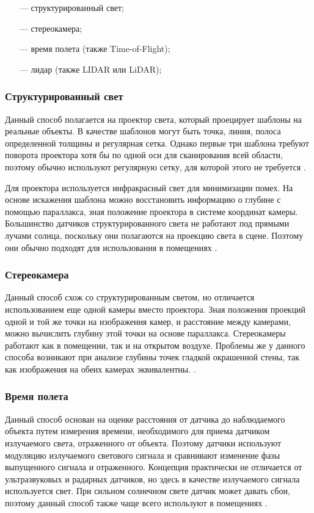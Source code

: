 \begin{itemize}
	\item[---] структурированный свет;
	\item[---] стереокамера;
	\item[---] время полета (также Time-of-Flight);
	\item[---] лидар (также LIDAR или LiDAR);
\end{itemize}

\subsubsection*{Структурированный свет}

Данный способ полагается на проектор света, который проецирует шаблоны на реальные объекты. В качестве шаблонов могут быть точка, линия, полоса определенной толщины и регулярная сетка. Однако первые три шаблона требуют поворота проектора хотя бы по одной оси для сканирования всей области, поэтому обычно используют регулярную сетку, для которой этого не требуется \cite{struct_light}. 

Для проектора используется инфракрасный свет для минимизации помех. На основе искажения шаблона можно восстановить информацию о глубине с помощью параллакса, зная положение проектора в системе координат камеры. Большинство датчиков структурированного света не работают под прямыми лучами солнца, поскольку они полагаются на проекцию света в сцене. Поэтому они обычно подходят для использования в помещениях \cite{struct_light}.

\subsubsection*{Стереокамера}

Данный способ схож со структурированным светом, но отличается использованием еще одной камеры вместо проектора. Зная положения проекций одной и той же точки на изображения камер, и расстояние между камерами, можно вычислить глубину этой точки на основе параллакса. Стереокамеры работают как в помещении, так и на открытом воздухе. Проблемы же у данного способа возникают при анализе глубины точек гладкой окрашенной стены, так как изображения на обеих камерах эквивалентны. \cite{rgbd}.

\subsubsection*{Время полета}

Данный способ основан на оценке расстояния от датчика до наблюдаемого объекта путем измерения времени, необходимого для приема датчиком излучаемого света, отраженного от объекта. Поэтому датчики используют модуляцию излучаемого светового сигнала и сравнивают изменение фазы выпущенного сигнала и отраженного. Концепция практически не отличается от ультразвуковых и радарных датчиков, но здесь в качестве излучаемого сигнала используется свет. При сильном солнечном свете датчик может давать сбои, поэтому данный способ также чаще всего используют в помещениях \cite{rgbd}.

